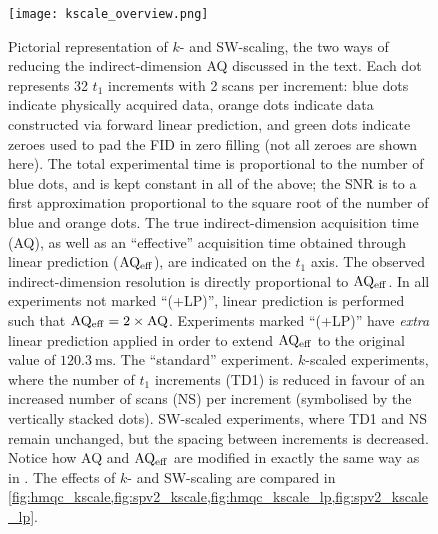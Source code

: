 \begin{figure}
    \centering
    \texttt{[image: kscale\_overview.png]}
    {\label{fig:kscale_overview_std}}
    {\label{fig:kscale_overview_k}}
    {\label{fig:kscale_overview_sw}}
    \caption{
        Pictorial representation of $k$- and SW-scaling, the two ways of reducing the indirect-dimension AQ discussed in the text.
        Each dot represents 32 $t_1$ increments with 2 scans per increment: blue dots indicate physically acquired data, orange dots indicate data constructed via forward linear prediction, and green dots indicate zeroes used to pad the FID in zero filling (not all zeroes are shown here).
        The total experimental time is proportional to the number of blue dots, and is kept constant in all of the above; the SNR is to a first approximation proportional to the square root of the number of blue and orange dots.
        The true indirect-dimension acquisition time (AQ), as well as an ``effective'' acquisition time obtained through linear prediction ($\mathrm{AQ_{eff}}$), are indicated on the $t_1$ axis.
        The observed indirect-dimension resolution is directly proportional to $\mathrm{AQ_{eff}}$.
        In all experiments not marked ``(+LP)'', linear prediction is performed such that $\mathrm{AQ_{eff}} = 2 \times \mathrm{AQ}$.
        Experiments marked ``(+LP)'' have \textit{extra} linear prediction applied in order to extend $\mathrm{AQ_{eff}}$ to the original value of $\SI{120.3}{\ms}$.
        \textbf{} The ``standard'' experiment.
        \textbf{} $k$-scaled experiments, where the number of $t_1$ increments (TD1) is reduced in favour of an increased number of scans (NS) per increment (symbolised by the vertically stacked dots).
        \textbf{} SW-scaled experiments, where TD1 and NS remain unchanged, but the spacing between increments is decreased.
        Notice how AQ and $\mathrm{AQ_{eff}}$ are modified in exactly the same way as in .
        The effects of $k$- and SW-scaling are compared in \cref{fig:hmqc_kscale,fig:spv2_kscale,fig:hmqc_kscale_lp,fig:spv2_kscale_lp}.
    }
    \label{fig:kscale_overview}
\end{figure}


